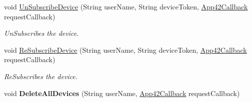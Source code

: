 \begin{DoxyCompactItemize}
\item 
void \hyperlink{classcom_1_1shephertz_1_1app42_1_1paas_1_1sdk_1_1windows_1_1push_1_1_push_notification_service_a82f1dd97db0235c322a5cfa62cf71f86}{Un\+Subscribe\+Device} (String user\+Name, String device\+Token, \hyperlink{interfacecom_1_1shephertz_1_1app42_1_1paas_1_1sdk_1_1windows_1_1_app42_callback}{App42\+Callback} request\+Callback)
\begin{DoxyCompactList}\small\item\em Un\+Subscribes the device. \end{DoxyCompactList}\item 
void \hyperlink{classcom_1_1shephertz_1_1app42_1_1paas_1_1sdk_1_1windows_1_1push_1_1_push_notification_service_a898599ec34eeab5fb5faa8b2c67ab5b2}{Re\+Subscribe\+Device} (String user\+Name, String device\+Token, \hyperlink{interfacecom_1_1shephertz_1_1app42_1_1paas_1_1sdk_1_1windows_1_1_app42_callback}{App42\+Callback} request\+Callback)
\begin{DoxyCompactList}\small\item\em Re\+Subscribes the device. \end{DoxyCompactList}\item 
\hypertarget{classcom_1_1shephertz_1_1app42_1_1paas_1_1sdk_1_1windows_1_1push_1_1_push_notification_service_a322f78d99fc6674ef9b68e513650c33d}{void {\bfseries Delete\+All\+Devices} (String user\+Name, \hyperlink{interfacecom_1_1shephertz_1_1app42_1_1paas_1_1sdk_1_1windows_1_1_app42_callback}{App42\+Callback} request\+Callback)}\label{classcom_1_1shephertz_1_1app42_1_1paas_1_1sdk_1_1windows_1_1push_1_1_push_notification_service_a322f78d99fc6674ef9b68e513650c33d}


\end{DoxyCompactItemize}
